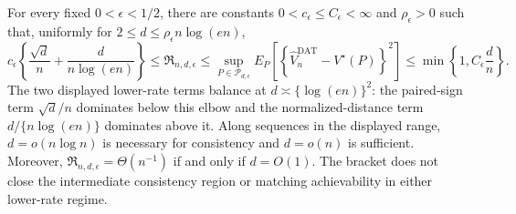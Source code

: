 For every fixed \(0<\epsilon<1/2\), there are constants \(0<c_\epsilon\le C_\epsilon<\infty\) and \(\rho_\epsilon>0\) such that, uniformly for \(2\le d\le\rho_\epsilon n\log(en)\),
\[
 c_\epsilon\left\{\frac{\sqrt d}{n}+\frac d{n\log(en)}\right\}
 \le\mathfrak R_{n,d,\epsilon}
 \le\sup_{P\in\mathcal P_{d,\epsilon}}
 E_P\!\left[
  \left\{\widehat V_n^{\mathrm{DAT}}-V^\star(P)\right\}^2
 \right]
 \le\min\!\left\{1,C_\epsilon\frac dn\right\}.
\]
The two displayed lower-rate terms balance at \(d\asymp\{\log(en)\}^2\): the paired-sign term \(\sqrt d/n\) dominates below this elbow and the normalized-distance term \(d/\{n\log(en)\}\) dominates above it.  Along sequences in the displayed range, \(d=o(n\log n)\) is necessary for consistency and \(d=o(n)\) is sufficient.  Moreover, \(\mathfrak R_{n,d,\epsilon}=\Theta(n^{-1})\) if and only if \(d=O(1)\).  The bracket does not close the intermediate consistency region or matching achievability in either lower-rate regime.